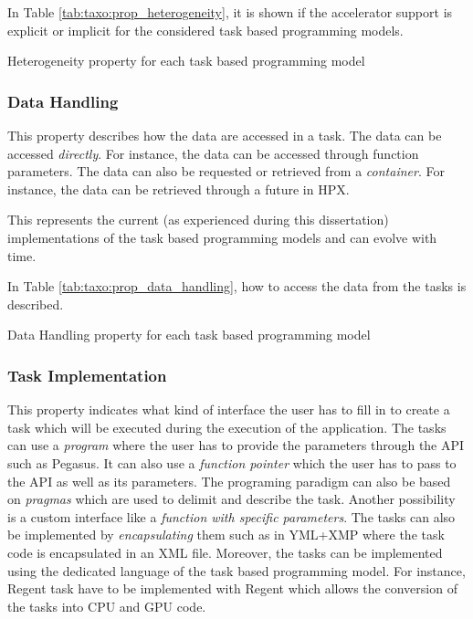 In Table \ref{tab:taxo:prop_heterogeneity}, it is shown if the accelerator support is explicit or implicit for the considered task based programming models.

\begin{table}[H]
	\caption{Heterogeneity property for each task based programming model \label{tab:taxo:prop_heterogeneity}}
	\centering
	\begin{multicols}{2}
		

		
	\end{multicols}
\end{table}

\subsubsection{Data Handling}
This property describes how the data are accessed in a task.
The data can be accessed \textit{directly}.
For instance, the data can be accessed through function parameters.
The data can also be requested or retrieved from a \textit{container}.
For instance, the data can be retrieved through a future in HPX.

This represents the current (as experienced during this dissertation) implementations of the task based programming models and can evolve with time.

In Table \ref{tab:taxo:prop_data_handling}, how to access the data from the tasks is described.
\begin{table}[H]
	\caption{Data Handling property for each task based programming model \label{tab:taxo:prop_data_handling}}
	\centering
	\begin{multicols}{2}
		

		
	\end{multicols}
\end{table}

\subsubsection{Task Implementation}
This property indicates what kind of interface the user has to fill in to create a task which will be executed during the execution of the application.
The tasks can use a \textit{program} where the user has to provide the parameters through the API such as Pegasus.
It can also use a \textit{function pointer} which the user has to pass to the API as well as its parameters.
The programing paradigm can also be based on \textit{pragmas} which are used to delimit and describe the task.
Another possibility is a custom interface like a \textit{function with specific parameters}.
The tasks can also be implemented by \textit{encapsulating} them such as in YML+XMP where the task code is encapsulated in an XML file.
Moreover, the tasks can be implemented using the dedicated language of the task based programming model.
For instance, Regent task have to be implemented with Regent which allows the conversion of the tasks into CPU and GPU code.

